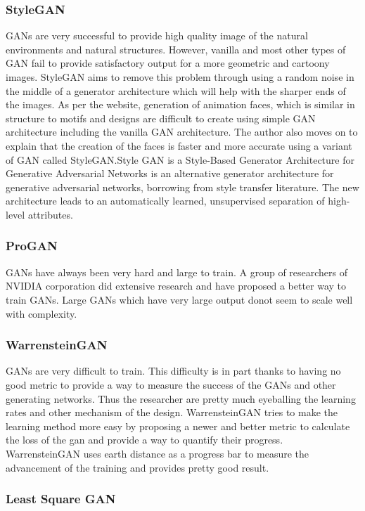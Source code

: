 \documentclass{article}
\begin{document}
\subsubsection{StyleGAN}
GANs are very successful to provide high quality image of the natural environments and natural structures. However, vanilla and most other types of GAN fail to provide satisfactory output for a more geometric and cartoony images. StyleGAN aims to remove this problem through using a random noise in the middle of a generator architecture which will help with the sharper ends of the images. As per the website, generation of animation faces, which is similar in structure to motifs and designs are difficult to create using simple GAN architecture including the vanilla GAN architecture. The author also moves on to explain that the creation of the faces is faster and more accurate using a variant of GAN called StyleGAN.Style GAN is a Style-Based Generator Architecture for Generative Adversarial Networks is an alternative generator architecture for generative adversarial networks, borrowing from style transfer literature. The new architecture leads to an automatically learned, unsupervised separation of high-level attributes.


\subsubsection{ProGAN}
GANs have always been very hard and large to train. A group of researchers of NVIDIA corporation did extensive research and have proposed a better way to train GANs. Large GANs which have very large output donot seem to scale well with complexity.
\subsubsection{WarrensteinGAN}
GANs are very difficult to train. This difficulty is in part thanks to having no good metric to provide a way to measure the success of the GANs and other generating networks. Thus the researcher are pretty much eyeballing the learning rates and other mechanism of the design. WarrensteinGAN tries to make the learning method more easy by proposing a newer and better metric to calculate the loss of the gan and provide a way to quantify their progress. WarrensteinGAN uses earth distance as a progress bar to measure the advancement of the training and provides pretty good result.

\subsubsection{Least Square GAN}
\end{document}
